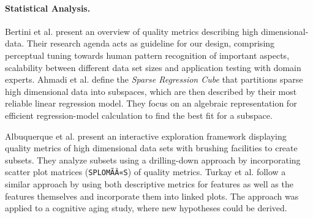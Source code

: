 \documentclass[journal]{style/vgtc} 			          %
\begin{document}
\paragraph{Statistical Analysis.}
Bertini et al. \cite{Bertini} present an overview of quality metrics describing high dimensional-data.
Their research agenda acts as guideline for our design, comprising perceptual tuning towards human pattern recognition of important aspects, scalability between different data set sizes and application testing with domain experts.
Ahmadi et al. \cite{Ahmadi} define the \emph{Sparse Regression Cube} that partitions sparse high dimensional data into subspaces, which are then described by their most reliable linear regression model.
They focus on an algebraic representation for efficient regression-model calculation to find the best fit for a subspace.

Albuquerque et al. \cite{Albuquerque} present an interactive exploration framework displaying quality metrics of high dimensional data sets with brushing facilities to create subsets.
They analyze subsets using a drilling-down approach by incorporating scatter plot matrices (\texttt{SPLOMÃÂ«S}) of quality metrics. %
Turkay et al. \cite{Turkay} follow a similar approach by using both descriptive metrics for features as well as the features themselves and incorporate them into linked plots.
The approach was applied to a cognitive aging study, where new hypotheses could be derived.
\end{document}
